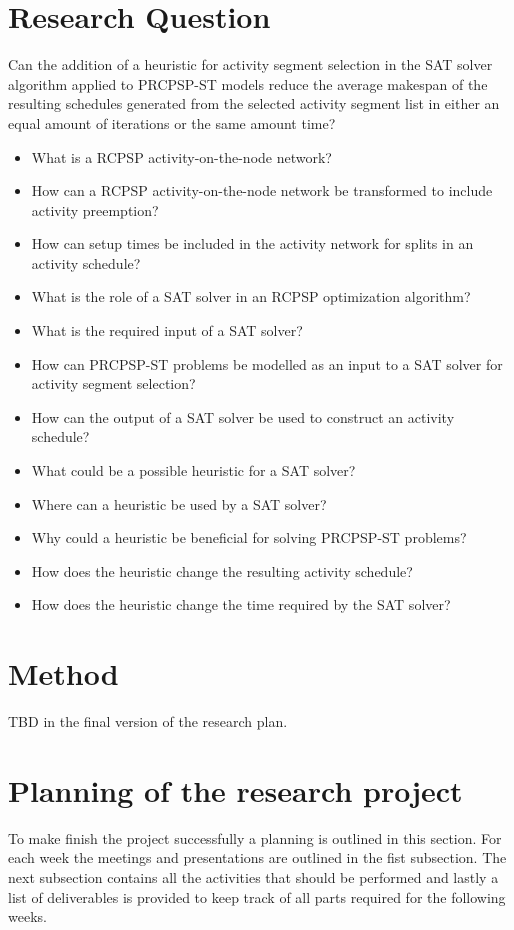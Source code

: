 \documentclass[english]{article}
\begin{document}
\section*{Research Question}
Can the addition of a heuristic for activity segment selection in the SAT solver algorithm applied to PRCPSP-ST models reduce the average makespan of the resulting schedules generated from the selected activity segment list in either an equal amount of iterations or the same amount time?
{\begin{itemize}
    \item What is a RCPSP activity-on-the-node network?
    \item How can a RCPSP activity-on-the-node network be transformed to include activity preemption?
    \item How can setup times be included in the activity network for splits in an activity schedule?
    \item What is the role of a SAT solver in an RCPSP optimization algorithm?
    \item What is the required input of a SAT solver?
    \item How can PRCPSP-ST problems be modelled as an input to a SAT solver for activity segment selection?
    \item How can the output of a SAT solver be used to construct an activity schedule?
    \item What could be a possible heuristic for a SAT solver?
    \item Where can a heuristic be used by a SAT solver?
    \item Why could a heuristic be beneficial for solving PRCPSP-ST problems?
    \item How does the heuristic change the resulting activity schedule?
    \item How does the heuristic change the time required by the SAT solver?
\end{itemize}{}}


\section*{Method}
TBD in the final version of the research plan.

\section*{Planning of the research project}
To make finish the project successfully a planning is outlined in this section. For each week the meetings and presentations are outlined in the fist subsection. The next subsection contains all the activities that should be performed and lastly a list of deliverables is provided to keep track of all parts required for the following weeks.
\end{document}
